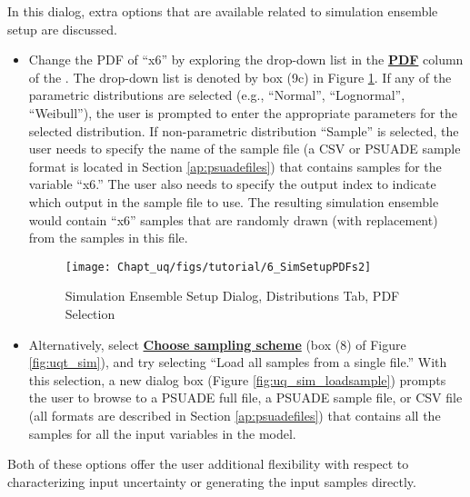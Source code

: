 \begin{enumerate}
In this dialog, extra options that are available related to simulation ensemble setup are discussed.
\begin{itemize}
\item{
Change the PDF of ``x6'' by exploring the drop-down list in the \textbf{\underline{PDF}} column of the . The drop-down list is denoted by box (9c) in Figure \ref{fig:uqt_sim_pdfs}. If any of the parametric distributions are selected (e.g., ``Normal'', ``Lognormal'', ``Weibull''), the user is  prompted to enter the appropriate parameters for the selected distribution. If non-parametric distribution ``Sample'' is selected, the user needs to specify the name of the sample file (a CSV or PSUADE sample format is located in Section \ref{ap:psuadefiles}) that contains samples for the variable ``x6.'' The user also needs to specify the output index to indicate which output in the sample file  to use. The resulting simulation ensemble would contain ``x6'' samples that are randomly drawn (with replacement) from the samples in this file.
\begin{figure}[H]
\centering \texttt{[image: Chapt\_uq/figs/tutorial/6\_SimSetupPDFs2]}
\caption{Simulation Ensemble Setup Dialog, Distributions Tab, PDF Selection}
\label{fig:uqt_sim_pdfs}
\end{figure}
}
\item{Alternatively, select \textbf{\underline{Choose sampling scheme}} (box (8) of Figure \ref{fig:uqt_sim}), and try selecting ``Load all samples from a single file.'' With this selection, a new dialog box (Figure \ref{fig:uq_sim_loadsample}) prompts the user to browse to a PSUADE full file, a PSUADE sample file, or CSV file (all formats are described in Section \ref{ap:psuadefiles}) that contains all the samples for all the input variables in the model.}
\end{itemize}
Both of these options offer the user additional flexibility with respect to characterizing input uncertainty or generating the input samples directly.


\end{enumerate}
